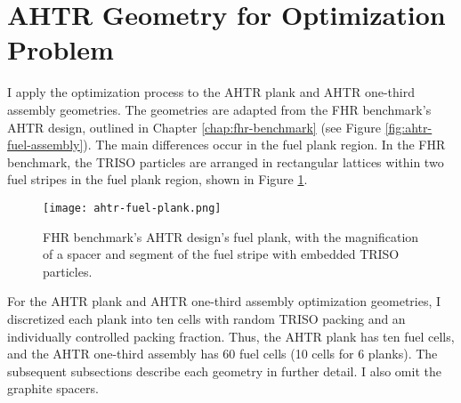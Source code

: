 \section{AHTR Geometry for Optimization Problem}
\label{sec:ahtr-geometry}
I apply the optimization process to the \gls{AHTR} plank and \gls{AHTR} one-third
assembly geometries.
The geometries are adapted from the \gls{FHR} benchmark's \gls{AHTR} design,
outlined in Chapter \ref{chap:fhr-benchmark} (see Figure \ref{fig:ahtr-fuel-assembly}).
The main differences occur in the fuel plank region. 
In the \gls{FHR} benchmark, the TRISO particles are arranged in rectangular lattices 
within two fuel stripes in the fuel plank region, shown in Figure 
\ref{fig:ahtr-fuel-plank-2}. 
\begin{figure}[htbp]
    \centering
    \texttt{[image: ahtr-fuel-plank.png]} 
            \hspace{0.5cm}
    \caption{\acrfull{FHR} benchmark's \acrfull{AHTR} design's fuel plank, with the 
    magnification of a spacer and segment of the fuel stripe with embedded 
    \gls{TRISO} particles.}
    \label{fig:ahtr-fuel-plank-2}
\end{figure}
For the \gls{AHTR} plank and \gls{AHTR} one-third assembly optimization geometries, 
I discretized each plank into ten cells with random TRISO packing and an individually 
controlled packing fraction. 
Thus, the \gls{AHTR} plank has ten fuel cells, and the \gls{AHTR} one-third assembly 
has 60 fuel cells (10 cells for 6 planks).  
The subsequent subsections describe each geometry in further detail.
I also omit the graphite spacers. 

